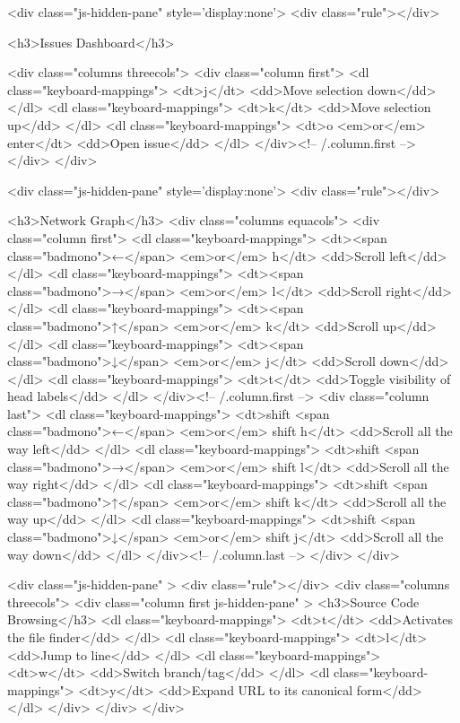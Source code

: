   <div class="js-hidden-pane" style='display:none'>
    <div class="rule"></div>

    <h3>Issues Dashboard</h3>

    <div class="columns threecols">
      <div class="column first">
        <dl class="keyboard-mappings">
          <dt>j</dt>
          <dd>Move selection down</dd>
        </dl>
        <dl class="keyboard-mappings">
          <dt>k</dt>
          <dd>Move selection up</dd>
        </dl>
        <dl class="keyboard-mappings">
          <dt>o <em>or</em> enter</dt>
          <dd>Open issue</dd>
        </dl>
      </div><!-- /.column.first -->
    </div>
  </div>

  <div class="js-hidden-pane" style='display:none'>
    <div class="rule"></div>

    <h3>Network Graph</h3>
    <div class="columns equacols">
      <div class="column first">
        <dl class="keyboard-mappings">
          <dt><span class="badmono">←</span> <em>or</em> h</dt>
          <dd>Scroll left</dd>
        </dl>
        <dl class="keyboard-mappings">
          <dt><span class="badmono">→</span> <em>or</em> l</dt>
          <dd>Scroll right</dd>
        </dl>
        <dl class="keyboard-mappings">
          <dt><span class="badmono">↑</span> <em>or</em> k</dt>
          <dd>Scroll up</dd>
        </dl>
        <dl class="keyboard-mappings">
          <dt><span class="badmono">↓</span> <em>or</em> j</dt>
          <dd>Scroll down</dd>
        </dl>
        <dl class="keyboard-mappings">
          <dt>t</dt>
          <dd>Toggle visibility of head labels</dd>
        </dl>
      </div><!-- /.column.first -->
      <div class="column last">
        <dl class="keyboard-mappings">
          <dt>shift <span class="badmono">←</span> <em>or</em> shift h</dt>
          <dd>Scroll all the way left</dd>
        </dl>
        <dl class="keyboard-mappings">
          <dt>shift <span class="badmono">→</span> <em>or</em> shift l</dt>
          <dd>Scroll all the way right</dd>
        </dl>
        <dl class="keyboard-mappings">
          <dt>shift <span class="badmono">↑</span> <em>or</em> shift k</dt>
          <dd>Scroll all the way up</dd>
        </dl>
        <dl class="keyboard-mappings">
          <dt>shift <span class="badmono">↓</span> <em>or</em> shift j</dt>
          <dd>Scroll all the way down</dd>
        </dl>
      </div><!-- /.column.last -->
    </div>
  </div>

  <div class="js-hidden-pane" >
    <div class="rule"></div>
    <div class="columns threecols">
      <div class="column first js-hidden-pane" >
        <h3>Source Code Browsing</h3>
        <dl class="keyboard-mappings">
          <dt>t</dt>
          <dd>Activates the file finder</dd>
        </dl>
        <dl class="keyboard-mappings">
          <dt>l</dt>
          <dd>Jump to line</dd>
        </dl>
        <dl class="keyboard-mappings">
          <dt>w</dt>
          <dd>Switch branch/tag</dd>
        </dl>
        <dl class="keyboard-mappings">
          <dt>y</dt>
          <dd>Expand URL to its canonical form</dd>
        </dl>
      </div>
    </div>
  </div>

